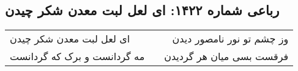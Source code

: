 \begin{center}
\section*{رباعی شماره ۱۴۲۲: ای لعل لبت معدن شکر چیدن}
\label{sec:1422}
\begin{longtable}{l p{0.5cm} r}
ای لعل لبت معدن شکر چیدن
&&
وز چشم تو نور نامصور دیدن
\\
مه گردانست و برک که گردانست
&&
فرقست بسی میان هر گردیدن
\\
\end{longtable}
\end{center}
